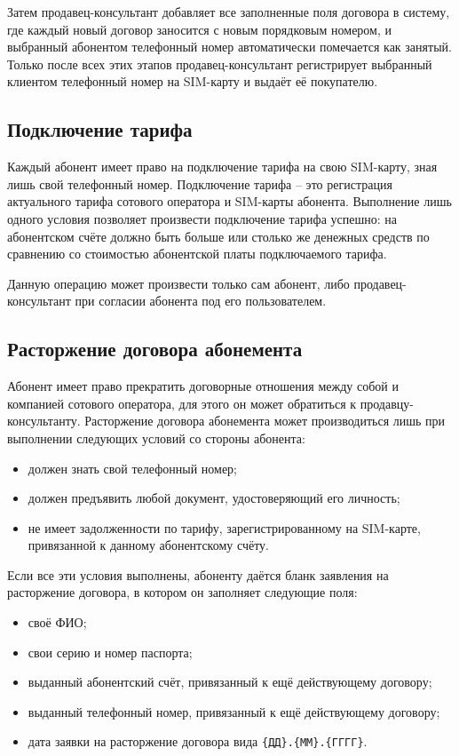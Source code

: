Затем продавец-консультант добавляет все заполненные поля договора в систему, где каждый новый договор заносится с новым порядковым номером, и выбранный абонентом телефонный номер автоматически помечается как занятый. Только после всех этих этапов продавец-консультант регистрирует выбранный клиентом телефонный номер на SIM-карту и выдаёт её покупателю.


\subsection{Подключение тарифа}


Каждый абонент имеет право на подключение тарифа на свою SIM-карту, зная лишь свой телефонный номер. Подключение тарифа -- это регистрация актуального тарифа сотового оператора и SIM-карты абонента. Выполнение лишь одного условия позволяет произвести подключение тарифа успешно: на абонентском счёте должно быть больше или столько же денежных средств по сравнению со стоимостью абонентской платы подключаемого тарифа.

Данную операцию может произвести только сам абонент, либо продавец-консультант при согласии абонента под его пользователем.


\subsection{Расторжение договора абонемента}


Абонент имеет право прекратить договорные отношения между собой и компанией сотового оператора, для этого он может обратиться к продавцу-консультанту. Расторжение договора абонемента может производиться лишь при выполнении следующих условий со стороны абонента:
\begin{itemize}
    \item должен знать свой телефонный номер;
    \item должен предъявить любой документ, удостоверяющий его личность;
    \item не имеет задолженности по тарифу, зарегистрированному на SIM-карте, привязанной к данному абонентскому счёту.
\end{itemize} 

Если все эти условия выполнены, абоненту даётся бланк заявления на расторжение договора, в котором он заполняет следующие поля:
\begin{itemize}
    \item своё ФИО;
    \item свои серию и номер паспорта;
    \item выданный абонентский счёт, привязанный к ещё действующему договору;
    \item выданный телефонный номер, привязанный к ещё действующему договору;
    \item дата заявки на расторжение договора вида \texttt{\{ДД\}.\{ММ\}.\{ГГГГ\}}.
\end{itemize}

